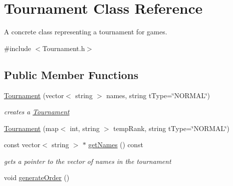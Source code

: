 \hypertarget{classTournament}{
\section{Tournament Class Reference}
\label{classTournament}
}


A concrete class representing a tournament for games.  


{\ttfamily \#include $<$Tournament.h$>$}\subsection*{Public Member Functions}
\begin{DoxyCompactItemize}
\item 
\hyperlink{classTournament_af86539aa2c25a2404b7e724158371071}{Tournament} (vector$<$ string $>$ names, string tType=\char`\"{}NORMAL\char`\"{})
\begin{DoxyCompactList}\small\item\em creates a \hyperlink{classTournament}{Tournament} \item\end{DoxyCompactList}\item 
\hyperlink{classTournament_a31d8b14b4863ce1d2ece89a2f48b8b44}{Tournament} (map$<$ int, string $>$ tempRank, string tType=\char`\"{}NORMAL\char`\"{})
\item 
const vector$<$ string $>$ $\ast$ \hyperlink{classTournament_a7afa6db20cf8ae5c4b5991f2fb29e04e}{getNames} () const 
\begin{DoxyCompactList}\small\item\em gets a pointer to the vector of names in the tournament \item\end{DoxyCompactList}\item 
\hypertarget{classTournament_a9154c5a5b93249e656e7c83757085ec6}{
void \hyperlink{classTournament_a9154c5a5b93249e656e7c83757085ec6}{generateOrder} ()}
\label{classTournament_a9154c5a5b93249e656e7c83757085ec6}


\end{DoxyCompactItemize}
